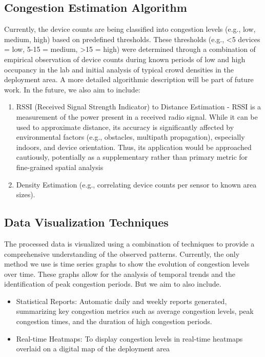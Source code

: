 \documentclass[runningheads]{llncs}
\begin{document}
\subsection{Congestion Estimation Algorithm}
Currently, the device counts are being classified into congestion levels (e.g., low, medium, high) based on predefined thresholds. These thresholds (e.g., <5 devices = low, 5-15 = medium, >15 = high) were determined through a combination of empirical observation of device counts during known periods of low and high occupancy in the lab and initial analysis of typical crowd densities in the deployment area. A more detailed algorithmic description will be part of future work. In the future, we also aim to include:
\begin{enumerate}
    \item RSSI (Received Signal Strength Indicator) to Distance Estimation - RSSI is a measurement of the power present in a received radio signal. While it can be used to approximate distance, its accuracy is significantly affected by environmental factors (e.g., obstacles, multipath propagation), especially indoors, and device orientation. Thus, its application would be approached cautiously, potentially as a supplementary rather than primary metric for fine-grained spatial analysis
    \item Density Estimation (e.g., correlating device counts per sensor to known area sizes).
\end{enumerate}




\subsection{Data Visualization Techniques} 
The processed data is visualized using a combination of techniques to provide a comprehensive understanding of the observed patterns.
Currently, the only method we use is time series graphs to show the evolution of congestion levels over time. These graphs allow for the analysis of temporal trends and the identification of peak congestion periods.
But we aim to also include. 
\begin{itemize}
    \item Statistical Reports: Automatic daily and weekly reports  generated, summarizing key congestion metrics such as average congestion levels, peak congestion times, and the duration of high congestion periods.
    \item Real-time Heatmaps: To display congestion levels in real-time heatmaps overlaid on a digital map of the deployment area

\end{itemize}
\end{document}
